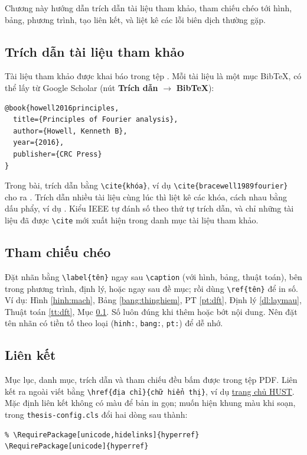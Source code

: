 Chương này hướng dẫn trích dẫn tài liệu tham khảo, tham chiếu chéo tới hình, bảng, phương trình, tạo liên kết, và liệt kê các lỗi biên dịch thường gặp.

\subsection{Trích dẫn tài liệu tham khảo}
\label{sec:trichdan}
Tài liệu tham khảo được khai báo trong tệp . Mỗi tài liệu là một mục BibTeX, có thể lấy từ Google Scholar (nút \textbf{Trích dẫn} $\rightarrow$ \textbf{BibTeX}):
\begin{verbatim}
@book{howell2016principles,
  title={Principles of Fourier analysis},
  author={Howell, Kenneth B},
  year={2016},
  publisher={CRC Press}
}
\end{verbatim}
Trong bài, trích dẫn bằng \verb|\cite{khóa}|, ví dụ \verb|\cite{bracewell1989fourier}| cho ra \cite{bracewell1989fourier}. Trích dẫn nhiều tài liệu cùng lúc thì liệt kê các khóa, cách nhau bằng dấu phẩy, ví dụ \cite{stein2011fourier, howell2016principles}. Kiểu IEEE tự đánh số theo thứ tự trích dẫn, và chỉ những tài liệu đã được \verb|\cite| mới xuất hiện trong danh mục tài liệu tham khảo.

\subsection{Tham chiếu chéo}
Đặt nhãn bằng \verb|\label{tên}| ngay sau \verb|\caption| (với hình, bảng, thuật toán), bên trong phương trình, định lý, hoặc ngay sau đề mục; rồi dùng \verb|\ref{tên}| để in số. Ví dụ: Hình \ref{hinh:mach}, Bảng \ref{bang:thinghiem}, PT \ref{pt:dft}, Định lý \ref{dl:laymau}, Thuật toán \ref{tt:dft}, Mục \ref{sec:trichdan}. Số luôn đúng khi thêm hoặc bớt nội dung. Nên đặt tên nhãn có tiền tố theo loại (\texttt{hinh:}, \texttt{bang:}, \texttt{pt:}) để dễ nhớ.

\subsection{Liên kết}
Mục lục, danh mục, trích dẫn và tham chiếu đều bấm được trong tệp PDF. Liên kết ra ngoài viết bằng \verb|\href{địa chỉ}{chữ hiển thị}|, ví dụ \href{https://hust.edu.vn}{trang chủ HUST}. Mặc định liên kết không có màu để bản in gọn; muốn hiện khung màu khi soạn, trong \texttt{thesis-config.cls} đổi hai dòng sau thành:
\begin{verbatim}
% \RequirePackage[unicode,hidelinks]{hyperref}
\RequirePackage[unicode]{hyperref}
\end{verbatim}

